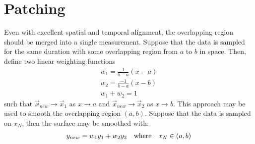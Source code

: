 \section{Patching}
Even with excellent spatial and temporal alignment, the overlapping region should be merged into a single measurement.
Suppose that the data is sampled for the same duration with some overlapping region from $a$ to $b$ in space.
Then, define two linear weighting functions
%
\begin{gather}
	w_1 = \frac{1}{b-a} \left( x - a \right) \\
	w_2 = \frac{-1}{b-a} \left( x - b \right) \\
	w_1 + w_2 = 1
\end{gather}
%
such that $\vec{x}_{new} \to \vec{x}_1$ as $x \to a$ and $\vec{x}_{new} \to \vec{x}_2$ as $x \to b$.
This approach may be used to smooth the overlapping region $(a,b)$. Suppose that the data is sampled on $x_N$, then the surface may be smoothed with:
%
\begin{gather}
	y_{new} = w_1 y_1 + w_2 y_2 \text{\quad where\quad} x_N \in (a, b)
\end{gather}
%